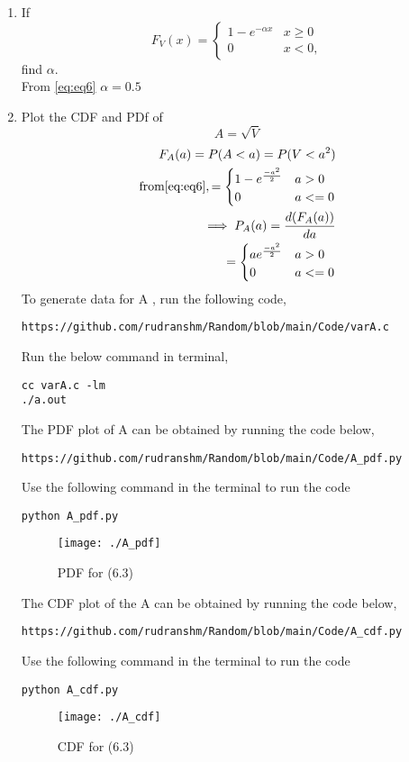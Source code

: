 \documentclass[journal,12pt,twocolumn]{IEEEtran}
\begin{document}
\begin{enumerate}[label=\thesection.\arabic*
,ref=\thesection.\theenumi]
%
\item
If
\begin{equation}
F_{V}(x) = 
\begin{cases}
1 - e^{-\alpha x} & x \geq 0 \\
0 & x < 0,
\end{cases}
\end{equation}
find $\alpha$.
\\
\solution 
From \eqref{eq:eq6} $\alpha=0.5$
%
\item
\label{ch3_raleigh_sim}
Plot the CDF and PDf of
%
\begin{equation}
A = \sqrt{V}
\end{equation}
%
\solution
\begin{align}
F_{A}(a)=P(A<a)=P(V<a^{2})\\
\text{from} \eqref{eq:eq6}, 
=\begin{cases}
1-e^{\frac{-a^{2}}{2}} & a>0\\
0 & a<=0
\end{cases}
\\
\implies P_{A}(a)= \frac{d(F_{A}(a))}{da}\\
=\begin{cases}
ae^{\frac{-a^{2}}{2}} & a>0\\
0 & a<=0
\end{cases}
\end{align}
To generate data for A , run the following code,
\begin{lstlisting}
https://github.com/rudranshm/Random/blob/main/Code/varA.c
\end{lstlisting}
Run the below command in terminal,
\begin{lstlisting}
cc varA.c -lm
./a.out
\end{lstlisting}
The PDF plot of A can be obtained by running the code below,
\begin{lstlisting}
https://github.com/rudranshm/Random/blob/main/Code/A_pdf.py
\end{lstlisting}
Use the following command in the terminal to run the code
\begin{lstlisting}
python A_pdf.py
\end{lstlisting}
\begin{figure}[h]
\texttt{[image: ./A\_pdf]}
\caption{PDF for (6.3)}
\label{fig:A_PDF}
\end{figure}
The CDF plot of the A can be obtained by running the code below,
\begin{lstlisting}
https://github.com/rudranshm/Random/blob/main/Code/A_cdf.py
\end{lstlisting}
Use the following command in the terminal to run the code
\begin{lstlisting}
python A_cdf.py
\end{lstlisting}
\begin{figure}[h]
\texttt{[image: ./A\_cdf]}
\caption{CDF for (6.3)}
\label{fig:A_PDF}
\end{figure}
\end{enumerate}
\end{document}

